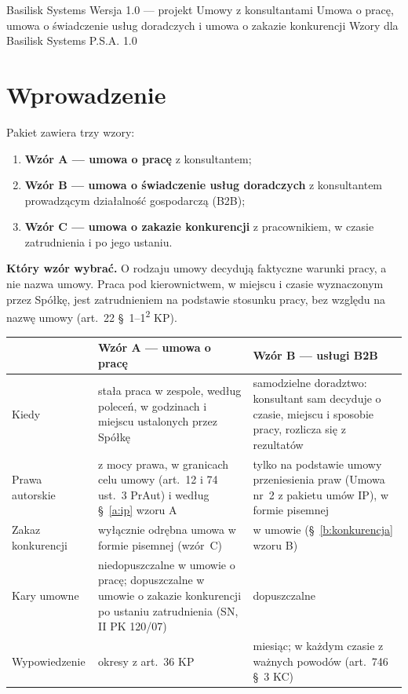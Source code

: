\documentclass[11pt,a4paper]{report}
\begin{document}
\BusinessPlanTitlePage
  {Basilisk Systems}
  {Wersja 1.0 --- projekt}
  {Umowy z konsultantami}
  {Umowa o pracę, umowa o świadczenie usług doradczych i umowa o zakazie konkurencji}
  {Wzory dla Basilisk Systems P.S.A.}
  {1.0}

\tableofcontents
\newpage

\chapter*{Wprowadzenie}

Pakiet zawiera trzy wzory:
\begin{enumerate}
  \item \textbf{Wzór A --- umowa o pracę} z konsultantem;
  \item \textbf{Wzór B --- umowa o świadczenie usług doradczych} z konsultantem prowadzącym działalność gospodarczą (B2B);
  \item \textbf{Wzór C --- umowa o zakazie konkurencji} z pracownikiem, w czasie zatrudnienia i po jego ustaniu.
\end{enumerate}

\textbf{Który wzór wybrać.} O rodzaju umowy decydują faktyczne warunki pracy, a nie nazwa umowy. Praca pod kierownictwem, w miejscu i czasie wyznaczonym przez Spółkę, jest zatrudnieniem na podstawie stosunku pracy, bez względu na nazwę umowy (art.~22 §~1--1\textsuperscript{2} KP).

\begin{center}
\begin{tabularx}{\linewidth}{@{}>{\raggedright\arraybackslash}p{3.4cm} >{\raggedright\arraybackslash}X >{\raggedright\arraybackslash}X@{}}
\toprule
 & \textbf{Wzór A --- umowa o pracę} & \textbf{Wzór B --- usługi B2B} \\
\midrule
Kiedy & stała praca w zespole, według poleceń, w godzinach i miejscu ustalonych przez Spółkę & samodzielne doradztwo: konsultant sam decyduje o czasie, miejscu i sposobie pracy, rozlicza się z rezultatów \\
Prawa autorskie & z mocy prawa, w granicach celu umowy (art.~12 i 74 ust.~3 PrAut) i według §~\ref{a:ip} wzoru A & tylko na podstawie umowy przeniesienia praw (Umowa nr~2 z pakietu umów IP), w formie pisemnej \\
Zakaz konkurencji & wyłącznie odrębna umowa w formie pisemnej (wzór~C) & w umowie (§~\ref{b:konkurencja} wzoru B) \\
Kary umowne & niedopuszczalne w umowie o pracę; dopuszczalne w umowie o zakazie konkurencji po ustaniu zatrudnienia (SN, II PK 120/07) & dopuszczalne \\
Wypowiedzenie & okresy z art.~36 KP & 1 miesiąc; w każdym czasie z ważnych powodów (art.~746 §~3 KC) \\
\bottomrule
\end{tabularx}
\end{center}
\end{document}
